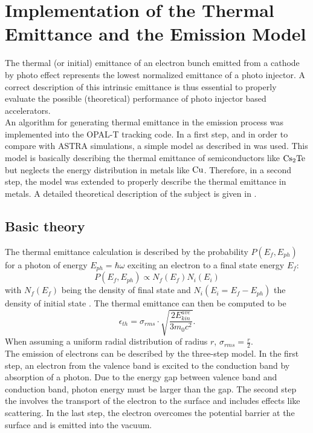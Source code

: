 \documentclass{psi-note}    %
\begin{document}
\section{Implementation of the Thermal Emittance and the Emission Model} \label{app:emission}
The thermal (or initial) emittance of an electron bunch emitted from a cathode
by photo effect represents the lowest normalized emittance of a photo injector.
A correct description of this intrinsic emittance is thus essential to properly
evaluate the possible (theoretical) performance of photo injector based
accelerators. \\
An algorithm for generating thermal emittance in the emission process was
implemented into the OPAL-T \cite{OPAL} tracking code.
In a first step, and in order to compare with ASTRA \cite{ASTRA} simulations, a
simple model as described in \cite{KLAUS} was used. This model is basically
describing the thermal emittance of semiconductors like $\rm{Cs_2 Te}$ but
neglects the energy distribution in metals like $\rm{Cu}$. Therefore, in a
second step, the model was extended to properly describe the thermal emittance
in metals. A detailed theoretical description of the subject is given in
\cite{DAVE}.\\

\subsection{Basic theory}
The thermal emittance calculation is described by the probability
$P(E_f,E_{ph})$ for a photon of energy $E_{ph}=\hbar\omega$ exciting an electron
to a final state energy $E_f$: $$P(E_f,E_{ph}) \propto N_f(E_f) N_i(E_i)$$ with
$N_f(E_f)$ being the density of final state and $N_i(E_i = E_f - E_{ph})$ the
density of initial state \cite{KLAUS}. The thermal emittance can then be
computed to be \cite{DAVE} $$\epsilon_{th} = \sigma_{rms} \cdot \sqrt{\frac{2
E_{kin}^{ave}}{3 m_0 c^2}} .$$ When assuming a uniform radial distribution of
radius $r$, $\sigma_{rms} = \frac{r}{2}$.\\
The emission of electrons can be described by the three-step model. In the first
step, an electron from the valence band is excited to the conduction band by
absorption of a photon. Due to the energy gap between valence band and
conduction band, photon energy must be larger than the gap. The second step  the
involves the transport of the electron to the surface and includes effects like
scattering. In the last step, the electron overcomes the potential barrier at
the surface and is emitted into the vacuum.
\end{document}
